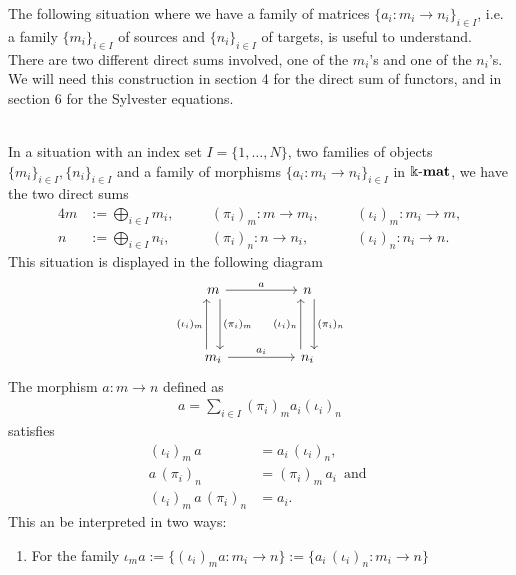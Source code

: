 The following situation where we have a family of matrices $\{a_{i} : m_{i} \rightarrow n_{i}\}_{i\in I}$,
i.e. a family $\{m_{i}\}_{i\in I}$ of sources and $\{n_{i}\}_{i\in I}$ of targets, is useful to understand. There are two
different direct sums involved, one of the $m_{i}$'s and one of the $n_{i}$'s. We will need this construction in section 4
for the direct sum of functors, and in section 6 for the Sylvester equations.

\begin{example}\phantom{}\label{ex:block_diagonal_matrix}\\
In a situation with an index set $I = \{1,\dots,N\}$, two families of objects $\{m_{i}\}_{i\in I}, \{n_{i}\}_{i\in I}$ and a family of
morphisms $\{a_{i} : m_{i} \rightarrow n_{i}\}_{i\in I}$ in $\Bbbk\textnormal{-}\mathbf{mat}$, we have the two direct sums
\begin{alignat}{4}
m &:= \bigoplus_{i\in I} m_{i},\quad &&(\pi_{i})_{m} : m \rightarrow m_{i},\quad &&(\iota_{i})_{m} : m_{i} \rightarrow m, \\
n &:= \bigoplus_{i\in I} n_{i},\quad &&(\pi_{i})_{n} : n \rightarrow n_{i},\quad &&(\iota_{i})_{n} : n_{i} \rightarrow n.
\end{alignat}
This situation is displayed in the following diagram
\[
\begin{tikzcd}
m \arrow[dd, "(\pi_{i})_{m}", shift left=2] \arrow[rr, "a"]           &  & n \arrow[dd, "(\pi_{i})_{n}", shift left=2]       \\
                                                                      &  &                                                   \\
m_{i} \arrow[uu, "(\iota_{i})_{m}", shift left=2] \arrow[rr, "a_{i}"] &  & n_{i} \arrow[uu, "(\iota_{i})_{n}", shift left=2]
\end{tikzcd}
\]
The morphism $a : m \rightarrow n$ defined as
\begin{align}
a = \sum_{i \in I} (\pi_{i})_{m} a_{i} (\iota_{i})_{n}
\end{align}
satisfies
\begin{align}
(\iota_{i})_{m}\, a &= a_{i}\, (\iota_{i})_{n}, \\
a\, (\pi_{i})_{n} &= (\pi_{i})_{m}\, a_{i}\,\text{ and }\\
(\iota_{i})_{m}\, a\, (\pi_{i})_{n} &= a_{i}.
\end{align}
This an be interpreted in two ways:
\begin{enumerate}
\renewcommand{\labelenumi}{(\theenumi)}
\item For the family $\iota_{m} a := \{ (\iota_{i})_{m} a : m_{i} \rightarrow n \} := \{ a_{i}\,(\iota_{i})_{n} : m_{i} \rightarrow n \}$

\end{enumerate}
\end{example}
